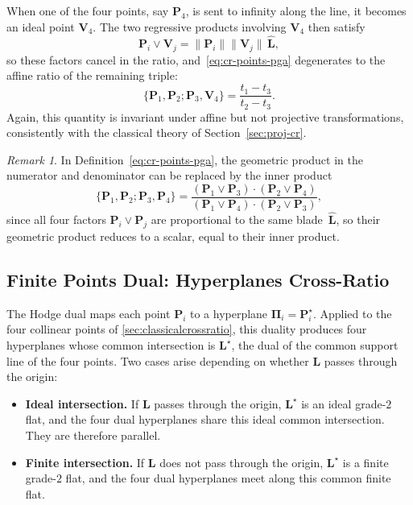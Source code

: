 \documentclass{birkjour}
\theoremstyle{definition}
\theoremstyle{remark}
\newtheorem{remark}[theorem]{Remark}
\begin{document}
When one of the four points, say $\mathbf{P}_4$, is sent to infinity
along the line, it becomes an ideal point $\mathbf{V}_4$. The two
regressive products involving $\mathbf{V}_4$ then satisfy
\begin{equation}
  \mathbf{P}_i \vee \mathbf{V}_j
  = \|\mathbf{P}_i\|\|\mathbf{V}_j\|\,\hat{\mathbf{L}},
\end{equation}
so these factors cancel in the ratio, and~\eqref{eq:cr-points-pga}
degenerates to the affine ratio of the remaining triple:
\begin{equation}
  \label{eq:pga_affine_ratio}
  \{\mathbf{P}_1, \mathbf{P}_2; \mathbf{P}_3, \mathbf{V}_4\}
  = \frac{t_1 - t_3}{t_2 - t_3}.
\end{equation}
Again, this quantity is invariant under affine but not projective
transformations, consistently with the classical theory of
Section~\ref{sec:proj-cr}.

\begin{remark}
In Definition~\eqref{eq:cr-points-pga}, the geometric product in the numerator and denominator can be replaced by the inner product
\begin{equation}
  \{\mathbf{P}_1, \mathbf{P}_2; \mathbf{P}_3, \mathbf{P}_4\}
  =  \frac{(\mathbf{P}_1 \vee \mathbf{P}_3)\cdot(\mathbf{P}_2 \vee \mathbf{P}_4)}
       {(\mathbf{P}_1 \vee \mathbf{P}_4)\cdot(\mathbf{P}_2 \vee \mathbf{P}_3)},
\end{equation}
since all four factors $\mathbf{P}_i \vee \mathbf{P}_j$ are proportional to the same blade~$\hat{\mathbf{L}}$, so their geometric product reduces to a scalar, equal to their inner product.
\end{remark}


\subsection{Finite Points Dual: Hyperplanes Cross-Ratio}
\label{sec:dual-hyperplane}
The Hodge dual maps each point $\mathbf{P}_i$ to a hyperplane
$\boldsymbol{\Pi}_i = \mathbf{P}_i^\star$. Applied to the four
collinear points of \cref{sec:classicalcrossratio}, this duality
produces four hyperplanes whose common intersection is $\mathbf{L}^\star$, the dual of the common support line of the four points. Two cases arise depending on whether
$\mathbf{L}$ passes through the origin:
\begin{itemize}
  \item \textbf{Ideal intersection.}
    If $\mathbf{L}$ passes through the origin, $\mathbf{L}^\star$ is an ideal
    grade-$2$ flat, and the four dual hyperplanes share this ideal
    common intersection. They are therefore parallel.
  \item \textbf{Finite intersection.}
    If $\mathbf{L}$ does not pass through the origin, $\mathbf{L}^\star$ is a finite
    grade-$2$ flat, and the four dual hyperplanes meet along this
    common finite flat.
\end{itemize}
\end{document}
